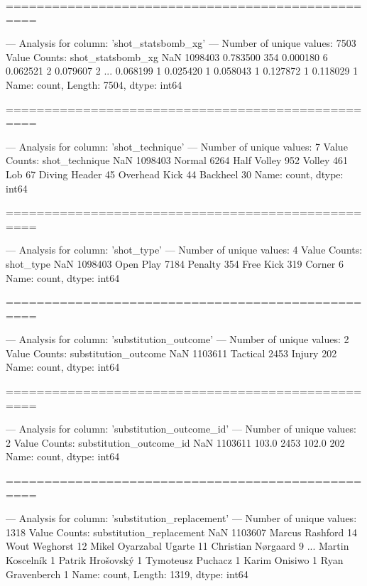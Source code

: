 ==================================================

--- Analysis for column: 'shot_statsbomb_xg' ---
Number of unique values: 7503
Value Counts:
shot_statsbomb_xg
NaN         1098403
0.783500        354
0.000180          6
0.062521          2
0.079607          2
             ...   
0.068199          1
0.025420          1
0.058043          1
0.127872          1
0.118029          1
Name: count, Length: 7504, dtype: int64

==================================================

--- Analysis for column: 'shot_technique' ---
Number of unique values: 7
Value Counts:
shot_technique
NaN              1098403
Normal              6264
Half Volley          952
Volley               461
Lob                   67
Diving Header         45
Overhead Kick         44
Backheel              30
Name: count, dtype: int64

==================================================

--- Analysis for column: 'shot_type' ---
Number of unique values: 4
Value Counts:
shot_type
NaN          1098403
Open Play       7184
Penalty          354
Free Kick        319
Corner             6
Name: count, dtype: int64

==================================================

--- Analysis for column: 'substitution_outcome' ---
Number of unique values: 2
Value Counts:
substitution_outcome
NaN         1103611
Tactical       2453
Injury          202
Name: count, dtype: int64

==================================================

--- Analysis for column: 'substitution_outcome_id' ---
Number of unique values: 2
Value Counts:
substitution_outcome_id
NaN      1103611
103.0       2453
102.0        202
Name: count, dtype: int64

==================================================

--- Analysis for column: 'substitution_replacement' ---
Number of unique values: 1318
Value Counts:
substitution_replacement
NaN                       1103607
Marcus Rashford                14
Wout Weghorst                  12
Mikel Oyarzabal Ugarte         11
Christian Nørgaard              9
                           ...   
Martin Koscelník                1
Patrik Hrošovský                1
Tymoteusz Puchacz               1
Karim Onisiwo                   1
Ryan Gravenberch                1
Name: count, Length: 1319, dtype: int64

